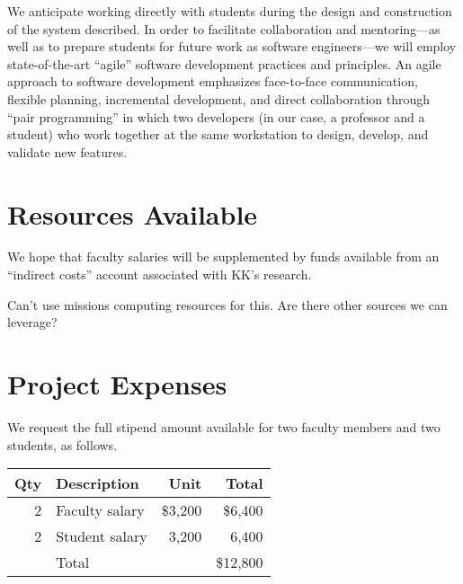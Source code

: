 \documentclass{article}
\begin{document}
We anticipate working directly with students
during the design and construction of the system described.
In order to facilitate collaboration and mentoring---as well as
to prepare students for future work
as software engineers---we will employ state-of-the-art
``agile'' software development
practices and principles.
An agile approach to software development emphasizes
face-to-face communication,
flexible planning,
incremental development,
and direct collaboration through ``pair programming'' in which two developers
(in our case, a professor and a student)
who work together at the same workstation
to design, develop, and validate new features.

\section{Resources Available}
\label{sec:resources-available}



We hope that faculty salaries will be supplemented
by funds available from
an ``indirect costs'' account associated with KK's research.

\begin{framed}
  Can't use missions computing resources for this.
  Are there other sources we can leverage?
\end{framed}

\section{Project Expenses}
\label{sec:project-expenses}



We request the full stipend amount available for
two faculty members
and two students, as follows.

\begin{center}
  \begin{tabular}{rlrr} \toprule
    Qty & Description    & Unit    & Total    \\ \midrule
    2   & Faculty salary & \$3,200 & \$6,400  \\
    2   & Student salary & 3,200   & 6,400    \\ \midrule
        & Total          &         & \$12,800 \\ \bottomrule
  \end{tabular}
\end{center}
\end{document}
